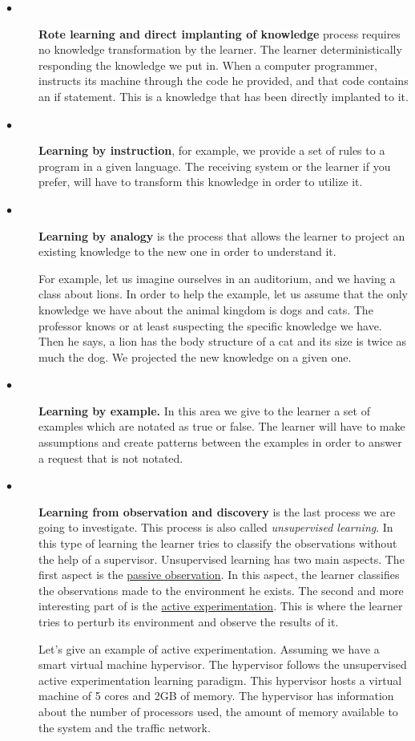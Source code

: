 \begin{description}
	\item[$\bullet$]{\bfseries Rote learning and direct implanting of knowledge} process requires no knowledge transformation by the learner. The learner deterministically responding the knowledge we put in. When a computer programmer, instructs its machine through the code he provided, and that code contains an if statement. This is a knowledge that has been directly implanted to it.
	\item[$\bullet$]{\bfseries Learning by instruction}, for example, we provide a set of rules to a program in a given language. The receiving system or the learner if you prefer, will have to transform this knowledge in order to utilize it.
	\item[$\bullet$] {\bfseries  Learning by analogy} is the process that allows the learner to project an existing knowledge to the new one in order to understand it.
	
	
	For example, let us imagine ourselves in an auditorium, and we having a class about lions. In order to help the example, let us assume that the only knowledge we have about the animal kingdom is dogs and cats. The professor knows or at least suspecting the specific knowledge we have. Then he says, a lion has the body structure of a cat and its size is twice as much the dog. We projected the new knowledge on a given one.
	
	\item[$\bullet$] {\bfseries Learning by example.} In this area we give to the learner a set of examples which are notated as true or false. The learner will have to make assumptions and create patterns between the examples in order to answer a request that is not notated.
	
	\item[$\bullet$] {\bfseries Learning from observation and discovery} is the last process we are going to investigate. This process is also called \textit{unsupervised learning}.
	In this type of learning the learner tries to classify the observations without the help of a supervisor. Unsupervised learning has two main aspects. The first aspect is the \underline{passive observation}. In this aspect, the learner classifies the observations made to the environment he exists. The second and more interesting part of is the \underline{active experimentation}. This is where the learner tries to perturb its environment and observe the results of it. 
	
	Let's give an example of active experimentation. Assuming we have a smart virtual machine hypervisor. The hypervisor follows the unsupervised active experimentation learning paradigm. This hypervisor hosts a virtual machine of 5 cores and 2GB of memory. The hypervisor has information about the number of processors used, the amount of memory available to the system and the traffic network.
	

\end{description}
